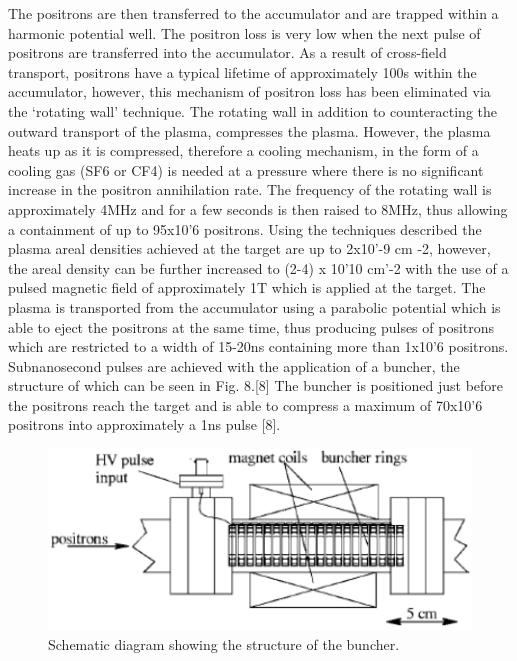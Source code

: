 The positrons are then transferred to the accumulator and are trapped within a harmonic potential well. The positron loss is very low when the next pulse of positrons are transferred into the accumulator. As a result of cross-field transport, positrons have a typical lifetime of approximately 100s within the accumulator, however, this mechanism of positron loss has been eliminated via the ‘rotating wall’ technique.
The rotating wall in addition to counteracting the outward transport of the plasma, compresses the plasma. However, the plasma heats up as it is compressed, therefore a cooling mechanism, in the form of a cooling gas (SF6 or CF4) is needed at a pressure where there is no significant increase in the positron annihilation rate. The frequency of the rotating wall is approximately 4MHz and for a few seconds is then raised to 8MHz, thus allowing a containment of up to 95x10'6 positrons.
Using the techniques described the plasma areal densities achieved at the target are up to 2x10'-9 cm -2, however, the areal density can be further increased to (2-4) x 10'10 cm'-2 with the use of a pulsed magnetic field of approximately 1T which is applied at the target.
The plasma is transported from the accumulator using a parabolic potential which is able to eject the positrons at the same time, thus producing pulses of positrons which are restricted to a width of 15-20ns containing more than 1x10'6 positrons. Subnanosecond pulses are achieved with the application of a buncher, the structure of which can be seen in Fig. 8.[8] The buncher is positioned just before the positrons reach the target and is able to compress a maximum of 70x10'6 positrons into approximately a 1ns pulse [8].

\begin{figure}[h]
\centering
\includegraphics{Figures/C2F8}
\decoRule
\caption[C2F8]{Schematic diagram showing the structure of the buncher.}
\label{fig:C2F8}
\end{figure}

